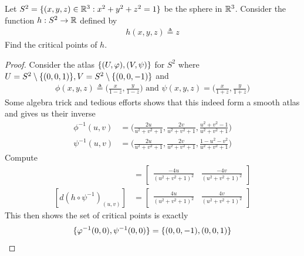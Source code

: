 \documentclass{report}
\begin{document}
\begin{question}{}{}
  Let $S^2=\{ (x,y,z)\in\mathbb{R}^3:x^2+y^2+z^2=1 \}$ be the sphere in $\mathbb{R}^3$. Consider the function $h:S^2\rightarrow \mathbb{R}$ defined by 
  \begin{align*}
  h(x,y,z)\triangleq z
  \end{align*}
Find the critical points of $h$. 
\end{question}
\begin{proof}
Consider the atlas $\{ (U,\varphi),(V,\psi) \}$ for $S^2$ where  $U=S^2 \setminus \{ (0,0,1) \},V=S^2 \setminus  \{ (0,0,-1) \}$ and 
\begin{align*}
\phi (x,y,z)\triangleq \Big(\frac{x}{1-z},\frac{y}{1-z}\Big)\text{ and }\psi (x,y,z)= \Big(\frac{x}{1+z},\frac{y}{1+z}\Big)
\end{align*}
Some algebra trick and tedious efforts shows that this indeed form a smooth atlas and gives us their inverse
\begin{align*}
  \phi^{-1}(u,v)&= \Big( \frac{2u}{u^2+v^2+1}, \frac{2v}{u^2+v^2+1}, \frac{u^2+v^2-1}{u^2+v^2+1} \Big) \\
  \psi^{-1}(u,v)&= \Big( \frac{2u}{u^2+v^2+1}, \frac{2v}{u^2+v^2+1}, \frac{1-u^2-v^2}{u^2+v^2+1} \Big)
\end{align*}
Compute 
\begin{align*}
  [d(h\circ \phi^{-1})_{(u,v)}]&=\begin{bmatrix}
    \frac{-4u}{(u^2+v^2+1)^2} & \frac{-4v}{(u^2+v^2+1)^2}
  \end{bmatrix} \\
  [d(h\circ \psi^{-1})_{(u,v)}]&=\begin{bmatrix}
    \frac{4u}{(u^2+v^2+1)^2} & \frac{4v}{(u^2+v^2+1)^2} 
  \end{bmatrix}
\end{align*}
This then shows the set of critical points is exactly 
\begin{align*}
\{ \varphi^{-1}(0,0),\psi^{-1}(0,0) \}=\{ (0,0,-1),(0,0,1) \}
\end{align*}
\end{proof}
\end{document}

